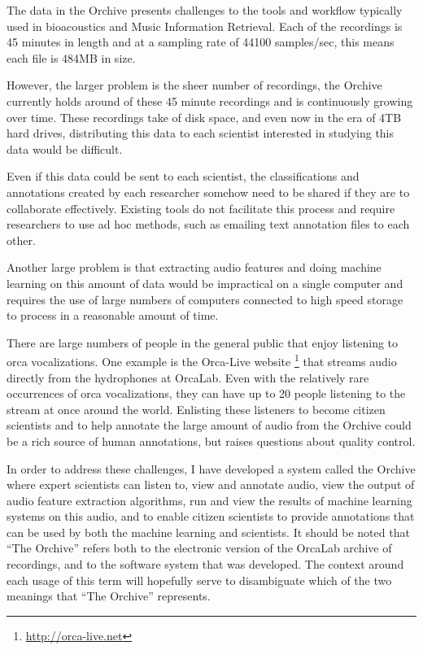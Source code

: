 
\label{chap:architecture}

The data in the Orchive presents challenges to the tools and workflow
typically used in bioacoustics and Music Information Retrieval.  Each
of the recordings is 45 minutes in length and at a sampling rate of
44100 samples/sec, this means each file is 484MB in size.

However, the larger problem is the sheer number of recordings, the
Orchive currently holds around \totalNumberOfOrchiveRecordings of
these 45 minute recordings and is continuously growing over time.
These recordings take \diskSpaceOrchive of disk space, and even now in
the era of 4TB hard drives, distributing this data to each scientist
interested in studying this data would be difficult.

Even if this data could be sent to each scientist, the classifications
and annotations created by each researcher somehow need to be shared
if they are to collaborate effectively.  Existing tools do not
facilitate this process and require researchers to use ad hoc
methods, such as emailing text annotation files to each other.

Another large problem is that extracting audio features and doing
machine learning on this amount of data would be impractical on a
single computer and requires the use of large numbers of computers
connected to high speed storage to process in a reasonable amount of
time.

There are large numbers of people in the general public that enjoy
listening to orca vocalizations.  One example is the Orca-Live website
\footnote{\url{http://orca-live.net}} that streams audio directly from
the hydrophones at OrcaLab.  Even with the relatively rare occurrences
of orca vocalizations, they can have up to 20 people listening to the
stream at once around the world.  Enlisting these listeners to become
citizen scientists and to help annotate the large amount of audio from
the Orchive could be a rich source of human annotations, but raises
questions about quality control.

In order to address these challenges, I have developed a system
called the Orchive where expert scientists can listen to, view and
annotate audio, view the output of audio feature extraction
algorithms, run and view the results of machine learning systems on
this audio, and to enable citizen scientists to provide annotations
that can be used by both the machine learning and scientists.  It
should be noted that ``The Orchive'' refers both to the electronic
version of the OrcaLab archive of recordings, and to the software
system that was developed.  The context around each usage of this term
will hopefully serve to disambiguate which of the two meanings that
``The Orchive'' represents.

